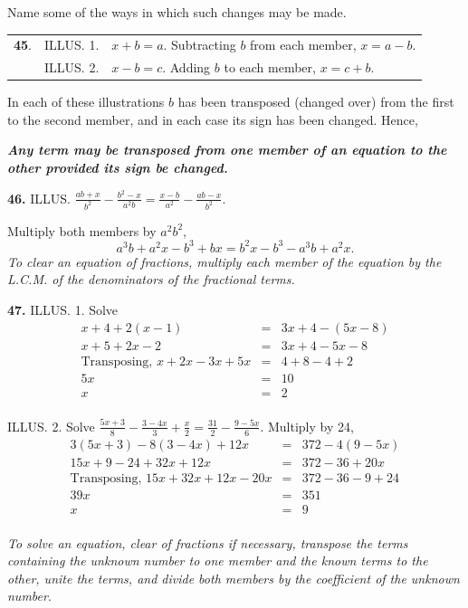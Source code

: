 \documentclass{book}
\begin{document}
Name some of the ways in which such changes may
be made.

\begin{tabular}{lcl}
\textbf{45}. &ILLUS. 1. &$x + b = a$. Subtracting $b$ from each
member, $x = a - b$.\\
&ILLUS. 2. &$x-b=c$. Adding $b$ to each member, $x = c + b$.
\end{tabular}

In each of these illustrations $b$ has been transposed
(changed over) from the first to the second member,
and in each case its sign has been changed. Hence,

\textbf{\textit{Any term may be transposed from one member of an
equation to the other provided its sign be changed.}}

\textbf{46.} ILLUS. $\displaystyle \frac{ab + x}{b^2} - \frac{b^2
- x}{a^2b} = \frac{x - b}{a^2} - \frac{ab - x}{b^2}$.

Multiply both members by $a^2b^2$,
\begin{equation*}
a^3b + a^2x - b^3 + bx = b^2 x - b^3 - a^3b + a^2x.
\end{equation*}
\textit{To clear an equation of fractions, multiply each member of
the equation by the L.C.M. of the denominators of the fractional
terms.}

\textbf{47.} ILLUS. 1. Solve \begin{eqnarray*}
x + 4 + 2(x - 1) & = & 3x + 4 - (5x - 8) \\
x + 5 + 2x - 2 & = & 3x + 4 - 5x - 8 \\
\text{Transposing, } x + 2x - 3x + 5x & = & 4 + 8 - 4 + 2 \\
5x & = & 10 \\
x & = & 2 \\
\end{eqnarray*}

ILLUS. 2. Solve $\displaystyle \frac{5x + 3}{8} - \frac{3 - 4x}{3}
+ \frac{x}{2} = \frac{31}{2} - \frac{9 - 5x}{6}$. Multiply by 24,
\begin{eqnarray*}
3(5x + 3) - 8(3 - 4x) + 12x & = & 372 - 4(9 - 5x) \\
15x + 9 - 24 + 32x + 12x & = & 372 - 36 + 20x \\
\text{Transposing, } 15x + 32x + 12x - 20x & = & 372 - 36 - 9 + 24 \\
39x & = & 351 \\
x & = & 9 \\
\end{eqnarray*}


\textit{ To solve an equation, clear of fractions if necessary,
transpose the terms containing the unknown number to one member
and the known terms to the other, unite the terms, and divide both
members by the coefficient of the unknown number}.
\end{document}
